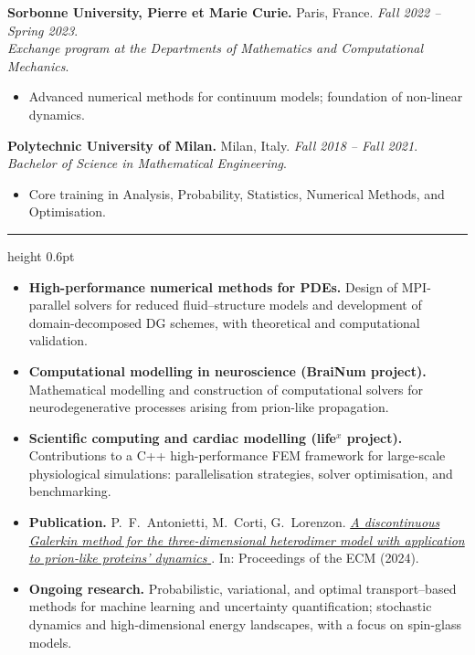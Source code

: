 \documentclass[10pt]{article}
\newcommand{\horizline}{\vspace{0.4em}\hrule height 0.6pt \vspace{0.4em}}
\newcommand{\sezione}[1]{
    \vspace{1em}{\large{\textsc{#1}}}
    \horizline
}
\newcommand{\period}[1]{\textit{#1}}
\newcommand{\place}[1]{{#1}}
\newcommand{\uni}[1]{
    \vspace{0.5em}
    \textbf{#1}
}
\newcommand{\degree}[1]{\textsl{#1}}
\newcommand{\hrefico}[2]{{%
\href{#1} {#2 {\footnotesize \ico{external-link-alt}}}}}
\newcommand{\ico}[1]{{\footnotesize \faIcon[regular]{#1}}}
\begin{document}
\uni{Sorbonne University, Pierre et Marie Curie.} \place{Paris, France}. \period{Fall 2022 -- Spring 2023}.\\
\degree{Exchange program at the Departments of Mathematics and Computational Mechanics}.
{\color{mygray}
\begin{itemize}
\item Advanced numerical methods for continuum models; foundation of non-linear dynamics.
\end{itemize}
}


\uni{Polytechnic University of Milan.} \place{Milan, Italy}. \period{Fall 2018 -- Fall 2021}.\\
\degree{Bachelor of Science in Mathematical Engineering}.
{\color{mygray}
\begin{itemize}
\item Core training in Analysis, Probability, Statistics, Numerical Methods, and Optimisation.
\end{itemize}
}

\sezione{Research activity}

{\color{mygray}
\begin{itemize}

    \item \textbf{High-performance numerical methods for PDEs.} 
    Design of MPI-parallel solvers for reduced fluid–structure models and development of domain-decomposed DG schemes, with theoretical and computational validation.

    \item \textbf{Computational modelling in neuroscience (BraiNum project).} 
    Mathematical modelling and construction of computational solvers for neurodegenerative processes arising from prion-like propagation.

    \item \textbf{Scientific computing and cardiac modelling (life$^x$ project).} 
    Contributions to a C++ high-performance FEM framework for large-scale physiological simulations: 
    parallelisation strategies, solver optimisation, and benchmarking.

    \item \textbf{Publication.} 
    P.~F.~Antonietti, M.~Corti, G.~Lorenzon. 
    \hrefico{https://www.arxiv.org/abs/2407.16065}{\textit{A discontinuous Galerkin method for the three-dimensional heterodimer model with application to prion-like proteins' dynamics}}. 
    In: Proceedings of the ECM (2024).

    \item \textbf{Ongoing research.} 
    Probabilistic, variational, and optimal transport–based methods for machine learning and uncertainty quantification; 
    stochastic dynamics and high-dimensional energy landscapes, with a focus on spin-glass models.

\end{itemize}
}
\end{document}
